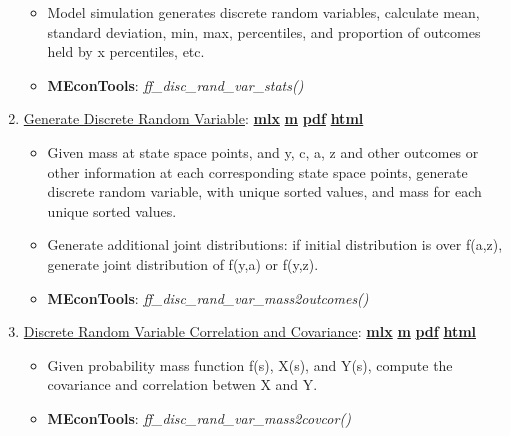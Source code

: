 \documentclass[
]{book}
\providecommand{\tightlist}{%
  \setlength{\itemsep}{0pt}\setlength{\parskip}{0pt}}
\begin{document}
\begin{enumerate}
  \begin{itemize}
  \tightlist
  \item
    Model simulation generates discrete random variables, calculate mean, standard deviation, min, max, percentiles, and proportion of outcomes held by x percentiles, etc.
  \item
    \textbf{MEconTools}: \emph{ff\_disc\_rand\_var\_stats()}
  \end{itemize}
\item
  \href{https://fanwangecon.github.io/MEconTools/MEconTools/doc/stats/htmlpdfm/fx_disc_rand_var_mass2outcomes.html}{Generate Discrete Random Variable}: \href{https://github.com/FanWangEcon/MEconTools/blob/master/MEconTools/doc/stats/fx_disc_rand_var_mass2outcomes.mlx}{\textbf{mlx}} \textbar{} \href{https://github.com/FanWangEcon/MEconTools/blob/master/MEconTools/doc/stats/htmlpdfm/fx_disc_rand_var_mass2outcomes.m}{\textbf{m}} \textbar{} \href{https://github.com/FanWangEcon/MEconTools/blob/master/MEconTools/doc/stats/htmlpdfm/fx_disc_rand_var_mass2outcomes.pdf}{\textbf{pdf}} \textbar{} \href{https://fanwangecon.github.io/MEconTools/MEconTools/doc/stats/htmlpdfm/fx_disc_rand_var_mass2outcomes.html}{\textbf{html}}

  \begin{itemize}
  \tightlist
  \item
    Given mass at state space points, and y, c, a, z and other outcomes or other information at each corresponding state space points, generate discrete random variable, with unique sorted values, and mass for each unique sorted values.
  \item
    Generate additional joint distributions: if initial distribution is over f(a,z), generate joint distribution of f(y,a) or f(y,z).
  \item
    \textbf{MEconTools}: \emph{ff\_disc\_rand\_var\_mass2outcomes()}
  \end{itemize}
\item
  \href{https://fanwangecon.github.io/MEconTools/MEconTools/doc/stats/htmlpdfm/fx_disc_rand_var_mass2covcor.html}{Discrete Random Variable Correlation and Covariance}: \href{https://github.com/FanWangEcon/MEconTools/blob/master/MEconTools/doc/stats/fx_disc_rand_var_mass2covcor.mlx}{\textbf{mlx}} \textbar{} \href{https://github.com/FanWangEcon/MEconTools/blob/master/MEconTools/doc/stats/htmlpdfm/fx_disc_rand_var_mass2covcor.m}{\textbf{m}} \textbar{} \href{https://github.com/FanWangEcon/MEconTools/blob/master/MEconTools/doc/stats/htmlpdfm/fx_disc_rand_var_mass2covcor.pdf}{\textbf{pdf}} \textbar{} \href{https://fanwangecon.github.io/MEconTools/MEconTools/doc/stats/htmlpdfm/fx_disc_rand_var_mass2covcor.html}{\textbf{html}}

  \begin{itemize}
  \tightlist
  \item
    Given probability mass function f(s), X(s), and Y(s), compute the covariance and correlation betwen X and Y.
  \item
    \textbf{MEconTools}: \emph{ff\_disc\_rand\_var\_mass2covcor()}
  \end{itemize}
\end{enumerate}
\end{document}
